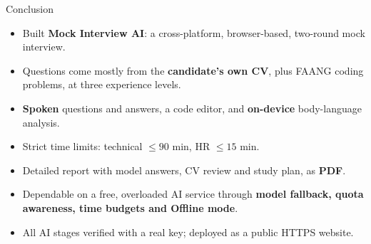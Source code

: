 \documentclass[aspectratio=169,11pt,xcolor=table]{beamer}
\begin{document}
\begin{frame}{Conclusion}
  \begin{itemize}
    \item Built \textbf{Mock Interview AI}: a cross-platform, browser-based, two-round mock interview.
    \item Questions come mostly from the \textbf{candidate's own CV}, plus FAANG coding problems, at three experience levels.
    \item \textbf{Spoken} questions and answers, a code editor, and \textbf{on-device} body-language analysis.
    \item Strict time limits: technical $\le 90$ min, HR $\le 15$ min.
    \item Detailed report with model answers, CV review and study plan, as \textbf{PDF}.
    \item Dependable on a free, overloaded AI service through \textbf{model fallback, quota awareness, time budgets and Offline mode}.
    \item All AI stages verified with a real key; deployed as a public HTTPS website.
  \end{itemize}
\end{frame}
\end{document}

